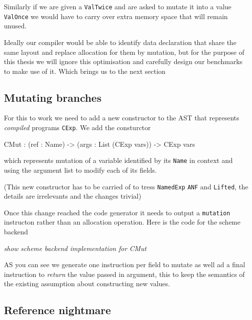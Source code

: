 \documentclass[
]{article}
\newenvironment{Shaded}{}{}
\newcommand{\DataTypeTok}[1]{\textcolor[rgb]{0.56,0.13,0.00}{#1}}
\newcommand{\NormalTok}[1]{#1}
\newcommand{\OperatorTok}[1]{\textcolor[rgb]{0.40,0.40,0.40}{#1}}
\newcommand{\OtherTok}[1]{\textcolor[rgb]{0.00,0.44,0.13}{#1}}
\begin{document}
Similarly if we are given a \texttt{ValTwice} and are asked to mutate it
into a value \texttt{ValOnce} we would have to carry over extra memory
space that will remain unused.

Ideally our compiler would be able to identify data declaration that
share the same layout and replace allocation for them by mutation, but
for the purpose of this thesis we will ignore this optimisation and
carefully design our benchmarks to make use of it. Which brings us to
the next section

\hypertarget{mutating-branches}{%
\subsection{Mutating branches}\label{mutating-branches}}

For this to work we need to add a new constructor to the AST that
represents \emph{compiled} programs \texttt{CExp}. We add the
consturctor

\begin{Shaded}
\begin{Highlighting}[]
\DataTypeTok{CMut} \OperatorTok{:}\NormalTok{ (ref }\OperatorTok{:} \DataTypeTok{Name}\NormalTok{) }\OtherTok{{-}\textgreater{}}\NormalTok{ (args }\OperatorTok{:} \DataTypeTok{List}\NormalTok{ (}\DataTypeTok{CExp}\NormalTok{ vars)) }\OtherTok{{-}\textgreater{}} \DataTypeTok{CExp}\NormalTok{ vars }
\end{Highlighting}
\end{Shaded}

which represents mutation of a variable identified by its \texttt{Name}
in context and using the argument list to modify each of its fields.

(This new constructor has to be carried of to tress \texttt{NamedExp}
\texttt{ANF} and \texttt{Lifted}, the details are irrelevants and the
changes trivial)

Once this change reached the code generator it needs to output a
\texttt{mutation} instructon rather than an allocation operation. Here
is the code for the scheme backend

\emph{show scheme backend implementation for CMut}

AS you can see we generate one instruction per field to mutate as well
ad a final instruction to \emph{return} the value passed in argument,
this to keep the semantics of the existing assumption about constructing
new values.

\hypertarget{reference-nightmare}{%
\subsection{Reference nightmare}\label{reference-nightmare}}
\end{document}
